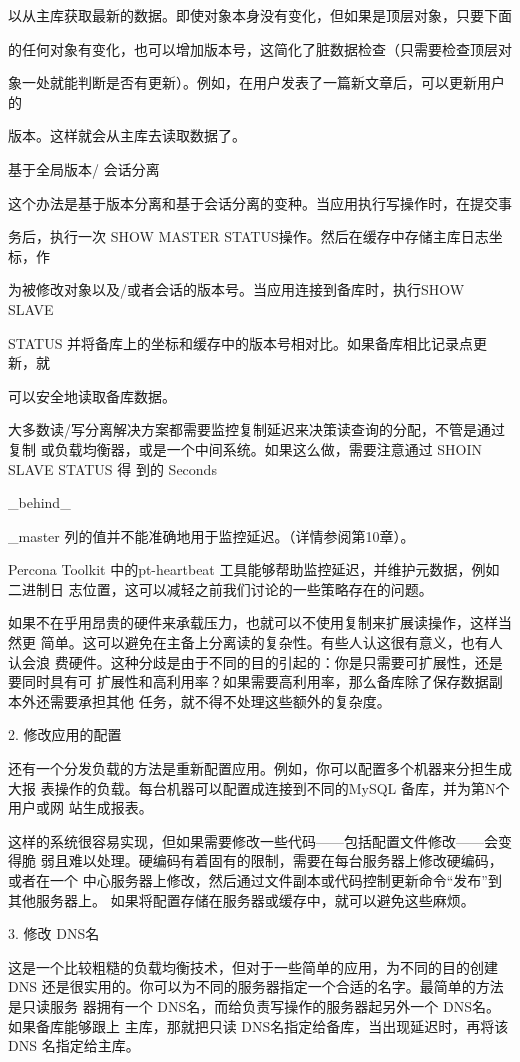 以从主库获取最新的数据。即使对象本身没有变化，但如果是顶层对象，只要下面

的任何对象有变化，也可以增加版本号，这简化了脏数据检查（只需要检查顶层对

象一处就能判断是否有更新）。例如，在用户发表了一篇新文章后，可以更新用户的

版本。这样就会从主库去读取数据了。

基于全局版本/ 会话分离

这个办法是基于版本分离和基于会话分离的变种。当应用执行写操作时，在提交事

务后，执行一次 SHOW MASTER STATUS操作。然后在缓存中存储主库日志坐标，作

为被修改对象以及/或者会话的版本号。当应用连接到备库时，执行SHOW SLAVE

STATUS 并将备库上的坐标和缓存中的版本号相对比。如果备库相比记录点更新，就

可以安全地读取备库数据。

大多数读/写分离解决方案都需要监控复制延迟来决策读查询的分配，不管是通过复制
或负载均衡器，或是一个中间系统。如果这么做，需要注意通过 SHOIN SLAVE STATUS 得
到的 Seconds

\_behind\_

\_master 列的值并不能准确地用于监控延迟。（详情参阅第10章）。

Percona Toolkit 中的pt-heartbeat 工具能够帮助监控延迟，并维护元数据，例如二进制日
志位置，这可以减轻之前我们讨论的一些策略存在的问题。

如果不在乎用昂贵的硬件来承载压力，也就可以不使用复制来扩展读操作，这样当然更
简单。这可以避免在主备上分离读的复杂性。有些人认这很有意义，也有人认会浪
费硬件。这种分歧是由于不同的目的引起的：你是只需要可扩展性，还是要同时具有可
扩展性和高利用率？如果需要高利用率，那么备库除了保存数据副本外还需要承担其他
任务，就不得不处理这些额外的复杂度。

2. 修改应用的配置

还有一个分发负载的方法是重新配置应用。例如，你可以配置多个机器来分担生成大报
表操作的负载。每台机器可以配置成连接到不同的MySQL 备库，并为第N个用户或网
站生成报表。

这样的系统很容易实现，但如果需要修改一些代码——包括配置文件修改——会变得脆
弱且难以处理。硬编码有着固有的限制，需要在每台服务器上修改硬编码，或者在一个
中心服务器上修改，然后通过文件副本或代码控制更新命令“发布”到其他服务器上。
如果将配置存储在服务器或缓存中，就可以避免这些麻烦。

3. 修改 DNS名

这是一个比较粗糙的负载均衡技术，但对于一些简单的应用，为不同的目的创建 DNS
还是很实用的。你可以为不同的服务器指定一个合适的名字。最简单的方法是只读服务
器拥有一个 DNS名，而给负责写操作的服务器起另外一个 DNS名。如果备库能够跟上
主库，那就把只读 DNS名指定给备库，当出现延迟时，再将该DNS 名指定给主库。

